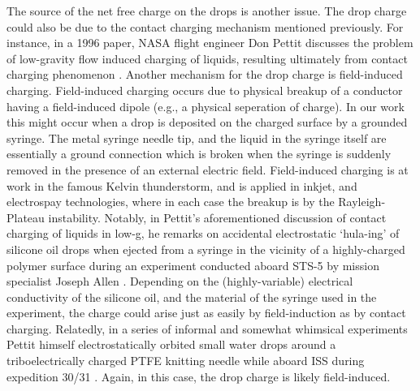 \documentclass[12pt,a4paper,oneside]{book}
\begin{document}
The source of the net free charge on the drops is another issue. The drop charge could also be due to the contact charging mechanism mentioned previously. For instance, in a 1996 paper, NASA flight engineer Don Pettit discusses the problem of low-gravity flow induced charging of liquids, resulting ultimately from contact charging phenomenon \cite{pettit_donald_flow_????}. Another mechanism for the drop charge is field-induced charging. Field-induced charging occurs due to physical breakup of a conductor having a field-induced dipole (e.g., a physical seperation of charge). In our work this might occur when a drop is deposited on the charged surface by a grounded syringe. The metal syringe needle tip, and the liquid in the syringe itself are essentially a ground connection which is broken when the syringe is suddenly removed in the presence of an external electric field. Field-induced charging is at work in the famous Kelvin thunderstorm, and is applied in inkjet, and electrospay technologies, where in each case the breakup is by the Rayleigh-Plateau instability. Notably, in Pettit's aforementioned discussion of contact charging of liquids in low-g, he remarks on accidental electrostatic `hula-ing' of silicone oil drops when ejected from a syringe in the vicinity of a highly-charged polymer surface during an experiment conducted aboard STS-5 by mission specialist Joseph Allen \cite{pettit_donald_flow_????}. Depending on the (highly-variable) electrical conductivity of the silicone oil, and the material of the syringe used in the experiment, the charge could arise just as easily by field-induction as by contact charging. Relatedly, in a series of informal and somewhat whimsical experiments Pettit himself electrostatically orbited small water drops around a triboelectrically charged PTFE knitting needle while aboard ISS during expedition 30/31 \cite{stevenson_electrostatic_2015}. Again, in this case, the drop charge is likely field-induced.  
\end{document}
